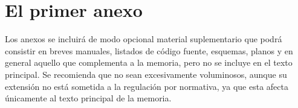 \chapter{El primer anexo}
\label{cap:AnexoA}

Los anexos se incluirá de modo opcional material suplementario que podrá consistir en breves manuales, listados de código fuente, esquemas, planos y en general aquello que complementa a la memoria, pero no se incluye en el texto principal. Se recomienda que no sean excesivamente voluminosos, aunque su extensión no está sometida a la regulación por normativa, ya que esta afecta únicamente al texto principal de la memoria. 




